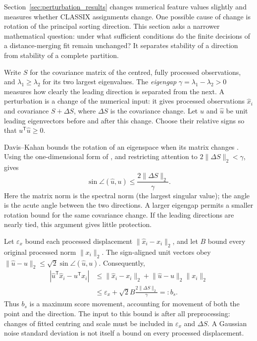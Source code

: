 Section~\ref{sec:perturbation_results} changes numerical feature values slightly and measures whether CLASSIX assignments change. One possible cause of change is rotation of the principal sorting direction. This section asks a narrower mathematical question: under what sufficient conditions do the finite decisions of a distance-merging fit remain unchanged? It separates stability of a direction from stability of a complete partition.

Write $S$ for the covariance matrix of the centred, fully processed observations, and $\lambda_1\geq\lambda_2$ for its two largest eigenvalues. The \emph{eigengap} $\gamma=\lambda_1-\lambda_2>0$ measures how clearly the leading direction is separated from the next. A perturbation is a change of the numerical input: it gives processed observations $\widehat x_i$ and covariance $S+\Delta S$, where $\Delta S$ is the covariance change. Let $u$ and $\widehat u$ be unit leading eigenvectors before and after this change. Choose their relative signs so that $u^{\mathsf T}\widehat u\geq0$.

Davis--Kahan bounds the rotation of an eigenspace when its matrix changes \citep{davis1970rotation}. Using the one-dimensional form of \citet[Corollary 1]{yu2015variant}, and restricting attention to $2\lVert\Delta S\rVert_2<\gamma$, gives
\[
 \sin\angle(\widehat u,u)\leq
 \frac{2\lVert\Delta S\rVert_2}{\gamma}.
\]
Here the matrix norm is the spectral norm (the largest singular value); the angle is the acute angle between the two directions. A larger eigengap permits a smaller rotation bound for the same covariance change. If the leading directions are nearly tied, this argument gives little protection.

Let $\varepsilon_x$ bound each processed displacement $\lVert\widehat x_i-x_i\rVert_2$, and let $B$ bound every original processed norm $\lVert x_i\rVert_2$. The sign-aligned unit vectors obey $\lVert\widehat u-u\rVert_2\leq\sqrt{2}\sin\angle(\widehat u,u)$. Consequently,
\begin{align*}
 |\widehat u^{\mathsf T}\widehat x_i-u^{\mathsf T}x_i|
 &\leq \lVert\widehat x_i-x_i\rVert_2
       +\lVert\widehat u-u\rVert_2\lVert x_i\rVert_2\\
 &\leq \varepsilon_x+\sqrt{2}B\frac{2\lVert\Delta S\rVert_2}{\gamma}
 =:b_s.
\end{align*}
Thus $b_s$ is a maximum score movement, accounting for movement of both the point and the direction. The input to this bound is after all preprocessing: changes of fitted centring and scale must be included in $\varepsilon_x$ and $\Delta S$. A Gaussian noise standard deviation is not itself a bound on every processed displacement.

